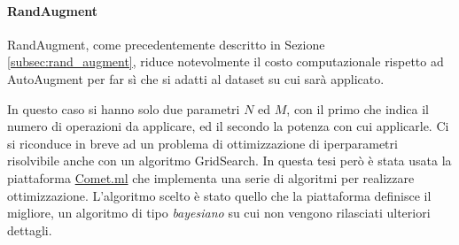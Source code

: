 \begin{table}[]
    \caption{Test dopo ulteriore fine tuning su KAIST}
    \label{table:fine_tuning_aav2_kaist}
\end{table}

\paragraph{RandAugment} 
RandAugment, come precedentemente descritto in Sezione \ref{subsec:rand_augment}, riduce notevolmente il costo computazionale rispetto ad AutoAugment per far sì che si adatti al dataset su cui sarà applicato. 

In questo caso si hanno solo due parametri $N$ ed $M$, con il primo che indica il numero di operazioni da applicare, ed il secondo la potenza con cui applicarle. Ci si riconduce in breve ad un problema di ottimizzazione di iperparametri risolvibile anche con un algoritmo GridSearch. In questa tesi però è stata usata la piattaforma \href{http://www.comet.ml}{Comet.ml} che implementa una serie di algoritmi per realizzare ottimizzazione. L'algoritmo scelto è stato quello che la piattaforma definisce il migliore, un algoritmo di tipo \textit{bayesiano} su cui non vengono rilasciati ulteriori dettagli.

